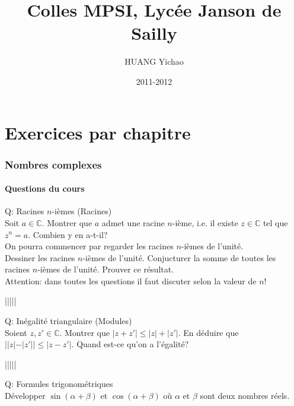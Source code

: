 \documentclass{article}
\begin{document}
\renewcommand\partname{Partie}

\title{Colles MPSI, Lyc\'ee Janson de Sailly}
\author{\textsf{HUANG Yichao}}
\date{2011-2012}

\maketitle
\tableofcontents
\newpage

\part{Exercices par chapitre}

\section{Nombres complexes}
\subsection{Questions du cours}
Q: Racines $n$-i\`emes (Racines)\\
Soit $a\in\mathbb{C}$. Montrer que $a$ admet une racine $n$-i\`eme, i.e. il existe $z\in\mathbb{C}$ tel que $z^n=a$. Combien y en a-t-il?\\
On pourra commencer par regarder les racines $n$-i\`emes de l'unit\'e.\\
Dessiner les racines $n$-i\`emes de l'unit\'e. Conjucturer la somme de toutes les racines $n$-i\`emes de l'unit\'e. Prouver ce r\'esultat.\\
Attention: dans toutes les questions il faut discuter selon la valeur de $n$!
\begin{center}
|||||
\end{center}
Q: In\'egalit\'e triangulaire (Modules)\\
Soient $z,z'\in\mathbb{C}$. Montrer que $|z+z'|\leq|z|+|z'|$. En d\'eduire que $||z|-|z'||\leq|z-z'|$. Quand est-ce qu'on a l'\'egalit\'e?
\begin{center}
|||||
\end{center}
Q: Formules trigonom\'etriques\\
D\'evelopper $\sin(\alpha+\beta)$ et $\cos(\alpha+\beta)$ o\`u $\alpha$ et $\beta$ sont deux nombres r\'eels.
\end{document}
